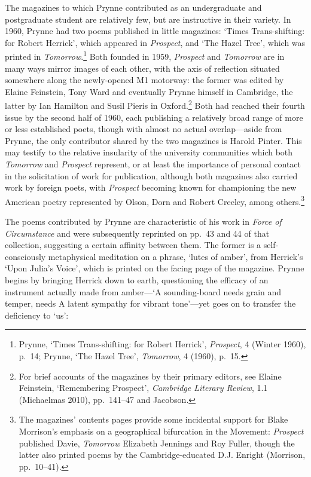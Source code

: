 \documentclass[]{article}
\begin{document}
The magazines to which Prynne contributed as an undergraduate and
postgraduate student are relatively few, but are instructive in their
variety. In 1960, Prynne had two poems published in little magazines:
`Times Trans-shifting: for Robert Herrick', which appeared in
\emph{Prospect}, and `The Hazel Tree', which was printed in
\emph{Tomorrow}.\footnote{Prynne, `Times Trans-shifting: for Robert
  Herrick', \emph{Prospect}, 4 (Winter 1960), p.~14; Prynne, `The Hazel
  Tree', \emph{Tomorrow}, 4 (1960), p.~15.} Both founded in 1959,
\emph{Prospect} and \emph{Tomorrow} are in many ways mirror images of
each other, with the axis of reflection situated somewhere along the
newly-opened M1 motorway: the former was edited by Elaine Feinstein,
Tony Ward and eventually Prynne himself in Cambridge, the latter by Ian
Hamilton and Susil Pieris in Oxford.\footnote{For brief accounts of the
  magazines by their primary editors, see Elaine Feinstein, `Remembering
  Prospect', \emph{Cambridge Literary Review}, 1.1 (Michaelmas 2010),
  pp.~141--47 and Jacobson.} Both had reached their fourth issue by the
second half of 1960, each publishing a relatively broad range of more or
less established poets, though with almost no actual overlap---aside
from Prynne, the only contributor shared by the two magazines is Harold
Pinter. This may testify to the relative insularity of the university
communities which both \emph{Tomorrow} and \emph{Prospect} represent, or
at least the importance of personal contact in the solicitation of work
for publication, although both magazines also carried work by foreign
poets, with \emph{Prospect} becoming known for championing the new
American poetry represented by Olson, Dorn and Robert Creeley, among
others.\footnote{The magazines' contents pages provide some incidental
  support for Blake Morrison's emphasis on a geographical bifurcation in
  the Movement: \emph{Prospect} published Davie, \emph{Tomorrow}
  Elizabeth Jennings and Roy Fuller, though the latter also printed
  poems by the Cambridge-educated D.J. Enright (Morrison, pp.~10--41).}

The poems contributed by Prynne are characteristic of his work in
\emph{Force of Circumstance} and were subsequently reprinted on pp.~43
and 44 of that collection, suggesting a certain affinity between them.
The former is a self-consciously metaphysical meditation on a phrase,
`lutes of amber', from Herrick's `Upon Julia's Voice', which is printed
on the facing page of the magazine. Prynne begins by bringing Herrick
down to earth, questioning the efficacy of an instrument actually made
from amber---`A sounding-board needs grain and temper, needs \textbar{}
A latent sympathy for vibrant tone'---yet goes on to transfer the
deficiency to `us':
\end{document}
